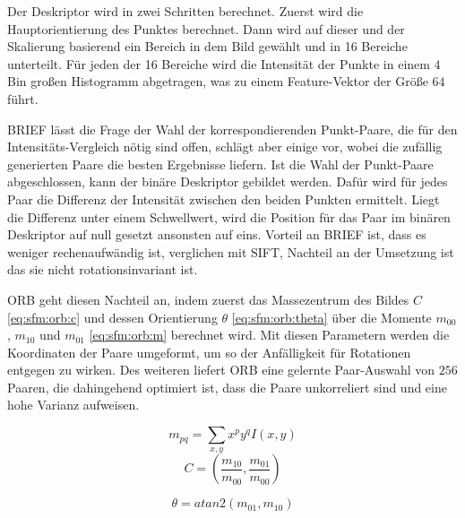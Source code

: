 \documentclass[12pt,titlepage, twoside]{article}
\begin{document}
Der Deskriptor wird in zwei Schritten berechnet. Zuerst wird die Hauptorientierung des Punktes berechnet. Dann wird auf dieser und der Skalierung basierend ein Bereich in dem Bild gewählt und in 16 Bereiche unterteilt.
Für jeden der 16 Bereiche wird die Intensität der Punkte in einem $4$ Bin großen Histogramm abgetragen, was zu einem Feature-Vektor der Größe $64$ führt.

BRIEF lässt die Frage der Wahl der korrespondierenden Punkt-Paare, die für den Intensitäts-Vergleich nötig sind offen, schlägt aber einige vor, wobei die zufällig generierten Paare die besten Ergebnisse liefern.
Ist die Wahl der Punkt-Paare abgeschlossen, kann der binäre Deskriptor gebildet werden. Dafür wird für jedes Paar die Differenz der Intensität zwischen den beiden Punkten ermittelt. 
Liegt die Differenz unter einem Schwellwert, wird die Position für das Paar im binären Deskriptor auf null gesetzt ansonsten auf eins.
Vorteil an BRIEF ist, dass es weniger rechenaufwändig ist, verglichen mit SIFT, Nachteil an der Umsetzung ist das sie nicht rotationsinvariant ist.

ORB geht diesen Nachteil an, indem zuerst das Massezentrum des Bildes $C$ \ref{eq:sfm:orb:c} und dessen Orientierung $\theta$ \ref{eq:sfm:orb:theta} 
über die Momente $m_{00}$, $m_{10}$ und $m_{01}$ \ref{eq:sfm:orb:m} berechnet wird.
Mit diesen Parametern werden die Koordinaten der Paare umgeformt, um so der Anfälligkeit für Rotationen entgegen zu wirken. 
Des weiteren liefert ORB eine gelernte Paar-Auswahl von $256$ Paaren, die dahingehend optimiert ist, dass die Paare unkorreliert sind und eine hohe Varianz aufweisen.

\begin{equation}
    \label{eq:sfm:orb:m}
    m_{pq} = \sum_{x,y}{x^py^qI(x,y)}
\end{equation}
\begin{equation}
    \label{eq:sfm:orb:c}
    C = ( \frac{m_{10}}{m_{00}}, \frac{m_{01}}{m_{00}} )
\end{equation}

\begin{equation}
    \label{eq:sfm:orb:theta}
    \theta = atan2(m_{01},m_{10})
\end{equation}
\end{document}
